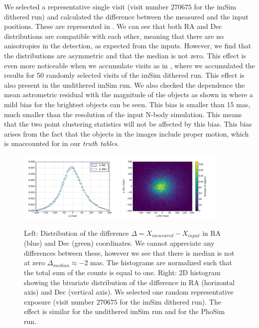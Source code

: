 \documentclass[\docopts]{\docclass}
\begin{document}
We selected a representative single visit (visit number $270675$ for the imSim dithered run) and calculated the difference between the measured and the input positions. These are represented in . We can see that both RA and Dec distributions are compatible with each other, meaning that there are no anisotropies in the detection, as expected from the inputs.
However, we find that the distributions are asymmetric and that the median is not zero. This effect is even more noticeable when we accumulate visits as in , where we accumulated the results for 50 randomly selected visits of the imSim dithered run. This effect is also present in the undithered imSim run. We also checked the dependence the mean astrometric residual with the magnitude of the objects as shown in  where a mild bias for the brightest objects can be seen. This bias is smaller than 15 mas, much smaller than the resolution of the input N-body simulation. This means that the two point clustering statistics will not be affected by this bias. This bias arises from the fact that the objects in the images include proper motion, which is unaccounted for in our \textit{truth tables}.

\begin{figure}
  \centering
  \includegraphics[width=0.45\textwidth]{astrometry_single_visit_imsim_dithered_hist}
  \includegraphics[width=0.45\textwidth]{astrometry_single_visit_imsim_dithered_hist2d}
  \caption{Left: Distribution of the difference $\Delta=X_{measured}-X_{input}$ in RA (blue) and Dec (green) coordinates. We cannot
  appreciate any differences between these, however we see that there is median is not at zero $\Delta_{median} \approx -2$ mas.
  The histograms are normalized such that the total sum of the counts is equal to one. Right: 2D histogram
  showing the bivariate distribution of the difference in RA (horizontal axis) and Dec (vertical axis). We selected one random representative
  exposure (visit number $270675$ for the imSim dithered run). The effect is similar for the undithered imSim run and for the PhoSim run.}
  \label{fig:astrometry_a}
\end{figure}
\end{document}
